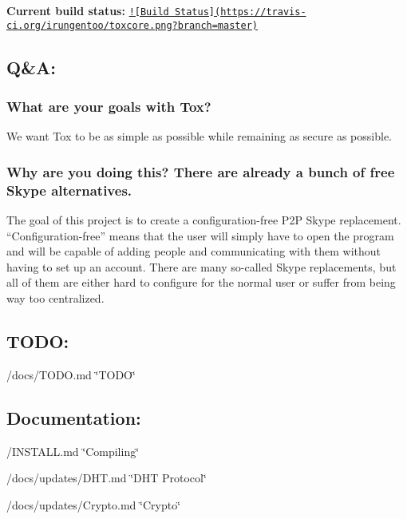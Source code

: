 {\bfseries Current build status\+:} \href{https://travis-ci.org/irungentoo/toxcore}{\tt !\mbox{[}Build Status\mbox{]}(https\+://travis-\/ci.\+org/irungentoo/toxcore.\+png?branch=master)}

\subsection*{Q\&A\+:}

\subsubsection*{What are your goals with Tox?}

We want Tox to be as simple as possible while remaining as secure as possible.

\subsubsection*{Why are you doing this? There are already a bunch of free Skype alternatives.}

The goal of this project is to create a configuration-\/free P2\+P Skype replacement. “\+Configuration-\/free” means that the user will simply have to open the program and will be capable of adding people and communicating with them without having to set up an account. There are many so-\/called Skype replacements, but all of them are either hard to configure for the normal user or suffer from being way too centralized.

\subsection*{T\+O\+D\+O\+:}


\begin{DoxyItemize}
\item /docs/\+T\+O\+D\+O.md \char`\"{}\+T\+O\+D\+O\char`\"{}
\end{DoxyItemize}

\subsection*{Documentation\+:}


\begin{DoxyItemize}
\item /\+I\+N\+S\+T\+A\+L\+L.md \char`\"{}\+Compiling\char`\"{}
\item /docs/updates/\+D\+H\+T.md \char`\"{}\+D\+H\+T Protocol\char`\"{}~\newline

\item /docs/updates/\+Crypto.md \char`\"{}\+Crypto\char`\"{}~\newline
 
\end{DoxyItemize}